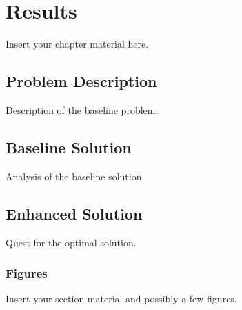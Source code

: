 
\chapter{Results}
\label{chapter:results}

Insert your chapter material here.


\section{Problem Description}
\label{section:problem}

Description of the baseline problem.


\section{Baseline Solution}
\label{section:baseline}

Analysis of the baseline solution.


\section{Enhanced Solution}
\label{section:enhanced}

Quest for the optimal solution.


\subsection{Figures}
\label{subsection:figures}

Insert your section material and possibly a few figures.

